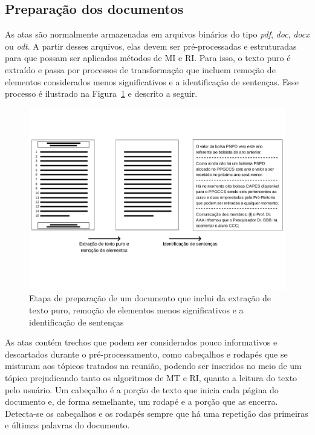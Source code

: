 
\subsection{Preparação dos documentos}


As atas são normalmente armazenadas em arquivos binários do tipo \textit{pdf}, \textit{doc}, \textit{docx} ou \textit{odt}. A partir desses arquivos, elas devem ser pré-processadas e estruturadas para que possam ser aplicados métodos de MI e RI. Para isso, o texto puro é extraído e passa por processos de transformação que incluem remoção de elementos considerados menos significativos e a identificação de sentenças. Esse processo é ilustrado na Figura~\ref{fig:preprocessamento-segmentacao} e descrito a seguir.

\begin{center}
	\begin{figure}[h!]

		\includegraphics[trim={ 0 100 0 100 },clip,page=1,width=\textwidth]{conteudo/capitulos/figs/preparacao-docs.pdf}

		\caption{Etapa de preparação de um documento que inclui da extração de texto puro,  remoção de elementos menos significativos e a identificação de sentenças}
		\label{fig:preprocessamento-segmentacao}
	\end{figure}
\end{center}




As atas contém trechos que podem ser considerados pouco informativos e descartados durante o pré-processamento, como cabeçalhos e rodapés que se misturam aos tópicos tratados na reunião, podendo ser inseridos no meio de um tópico prejudicando tanto os algoritmos de MT e RI, quanto a leitura do texto pelo usuário. Um cabeçalho é a porção de texto que inicia cada página do documento e, de forma semelhante, um rodapé e a porção que as encerra. Detecta-se os cabeçalhos e os rodapés sempre que há uma repetição das primeiras e últimas palavras do documento.


